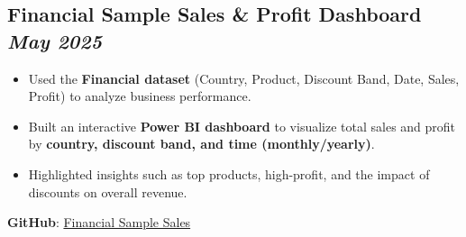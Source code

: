 \subsection*{Financial Sample Sales \& Profit Dashboard \hfill \textit{May 2025}}

\begin{itemize}
  \item Used the \textbf{Financial dataset} (Country, Product, Discount Band, Date, Sales, Profit) to analyze business performance.  
  \item Built an interactive \textbf{Power BI dashboard} to visualize total sales and profit by \textbf{ country, discount band, and time (monthly/yearly)}.  
  \item Highlighted insights such as top products, high-profit, and the impact of discounts on overall revenue.  
\end{itemize}
\textbf{GitHub}: \href{https://github.com/xuanduong2711/PowerBI}{Financial Sample Sales}
